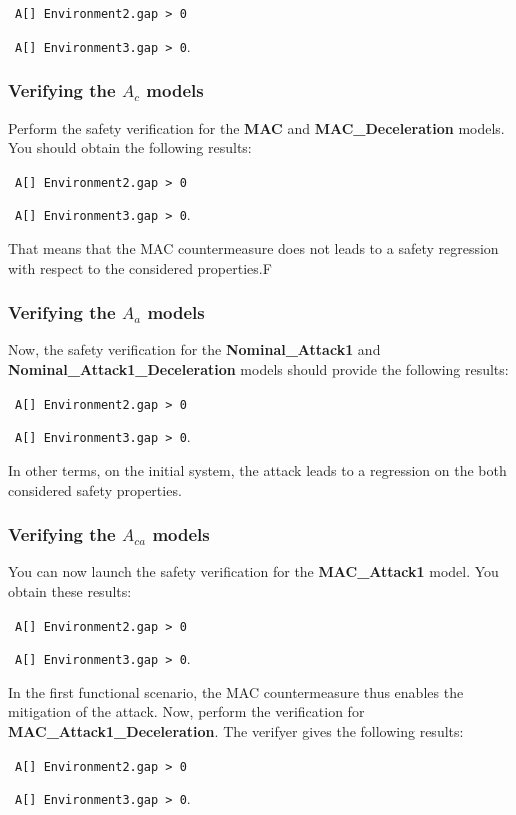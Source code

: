 \documentclass{article}
\newcommand{\cmark}{\textcolor{green}{\textbf{\ding{51}}}}
\newcommand{\xmark}{\textcolor{red}{\textbf{\ding{55}}}}
\begin{document}
\cmark~\verb|A[] Environment2.gap > 0|

\cmark~\verb|A[] Environment3.gap > 0|.


\subsubsection{Verifying the $A_c$ models}

Perform the safety verification for the \textbf{MAC} and \textbf{MAC\_Deceleration} models. You should obtain the following results:

\cmark~\verb|A[] Environment2.gap > 0|

\cmark~\verb|A[] Environment3.gap > 0|.

That means that the MAC countermeasure does not leads to a safety regression with respect to the considered properties.F


\subsubsection{Verifying the $A_a$ models}

Now, the safety verification for the \textbf{Nominal\_Attack1} and \textbf{Nominal\_Attack1\_Deceleration} models should provide the following results:

\xmark~\verb|A[] Environment2.gap > 0|

\xmark~\verb|A[] Environment3.gap > 0|.

In other terms, on the initial system, the attack leads to a regression on the both considered safety properties.

\subsubsection{Verifying the $A_{c a}$ models}

You can now launch the safety verification for the \textbf{MAC\_Attack1} model. You obtain these results:

\cmark~\verb|A[] Environment2.gap > 0|

\cmark~\verb|A[] Environment3.gap > 0|.

In the first functional scenario, the MAC countermeasure thus enables the mitigation of the attack. Now, perform the verification for \textbf{MAC\_Attack1\_Deceleration}. The verifyer gives the following results:

\xmark~\verb|A[] Environment2.gap > 0|

\xmark~\verb|A[] Environment3.gap > 0|.
\end{document}
